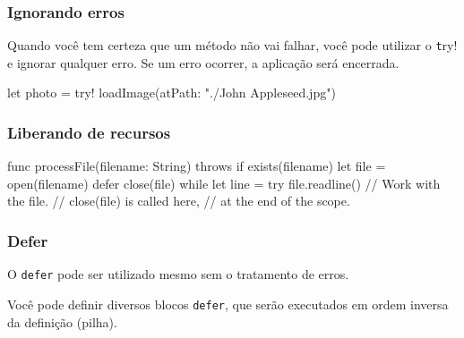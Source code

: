 \begin{frame}[fragile]
    \frametitle{Ignorando erros}

    Quando você tem certeza que um método não vai falhar, você pode
    utilizar o {\color{green} \texttt try!} e ignorar qualquer erro. Se
    um erro ocorrer, a aplicação será encerrada.
    \vspace{.7cm}
    \begin{swift}[basicstyle=\small]
let photo = try! loadImage(atPath: "./John Appleseed.jpg")
    \end{swift}

\end{frame}

\begin{frame}[fragile]
    \frametitle{Liberando de recursos}
    \begin{swift}[basicstyle=\small]
  func processFile(filename: String) throws {
      if exists(filename) {
          let file = open(filename)
          defer {
              close(file)
          }
          while let line = try file.readline() {
              // Work with the file.
          }
          // close(file) is called here,
          // at the end of the scope.
      }
  }
    \end{swift}
\end{frame}

\begin{frame}[fragile]
    \frametitle{Defer}

    O {\color{green}\texttt{defer}} pode ser utilizado mesmo sem o
    tratamento de erros.

    \vspace{.75cm}

    Você pode definir diversos blocos {\color{green}\texttt{defer}},
    que serão executados em ordem inversa da definição (pilha).
\end{frame}


